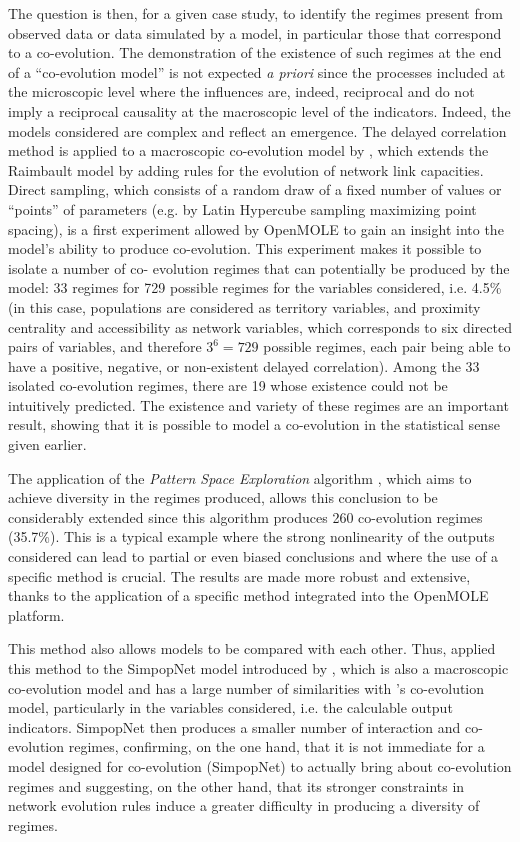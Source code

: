 \documentclass[10pt]{article}
\begin{document}
The question is then, for a given case study, to identify the regimes present from observed data or data simulated by a model, in particular those that correspond to a co-evolution. The demonstration of the existence of such regimes at the end of a ``co-evolution model'' is not expected \textit{a priori} since the processes included at the microscopic level where the influences are, indeed, reciprocal and do not imply a reciprocal causality at the macroscopic level of the indicators. Indeed, the models considered are complex and reflect an emergence. The delayed correlation method is applied to a macroscopic co-evolution model by \cite{raimbault2018modeling}, which extends the Raimbault model \citep{raimbault2018indirect} by adding rules for the evolution of network link capacities. Direct sampling, which consists of a random draw of a fixed number of values or ``points'' of parameters (e.g. by Latin Hypercube sampling maximizing point spacing), is a first experiment allowed by OpenMOLE to gain an insight into the model’s ability to produce co-evolution. This experiment makes it possible to isolate a number of co- evolution regimes that can potentially be produced by the model: 33 regimes for 729 possible regimes for the variables considered, i.e. 4.5\% (in this case, populations are considered as territory variables, and proximity centrality and accessibility as network variables, which corresponds to six directed pairs of variables, and therefore $3^6=729$ possible regimes, each pair being able to have a positive, negative, or non-existent delayed correlation). Among the 33 isolated co-evolution regimes, there are 19 whose existence could not be intuitively predicted. The existence and variety of these regimes are an important result, showing that it is possible to model a co-evolution in the statistical sense given earlier.

The application of the \emph{Pattern Space Exploration} algorithm \citep{10.1371/journal.pone.0138212}, which aims to achieve diversity in the regimes produced, allows this conclusion to be considerably extended since this algorithm produces 260 co-evolution regimes (35.7\%). This is a typical example where the strong nonlinearity of the outputs considered can lead to partial or even biased conclusions and where the use of a specific method is crucial. The results are made more robust and extensive, thanks to the application of a specific method integrated into the OpenMOLE platform.

This method also allows models to be compared with each other. Thus, \cite{raimbault2018unveiling} applied this method to the SimpopNet model introduced by \cite{schmitt2014modelisation}, which is also a macroscopic co-evolution model and has a large number of similarities with \citep{raimbault2018modeling}'s co-evolution model, particularly in the variables considered, i.e. the calculable output indicators. SimpopNet then produces a smaller number of interaction and co-evolution regimes, confirming, on the one hand, that it is not immediate for a model designed for co-evolution (SimpopNet) to actually bring about co-evolution regimes and suggesting, on the other hand, that its stronger constraints in network evolution rules induce a greater difficulty in producing a diversity of regimes.
\end{document}
